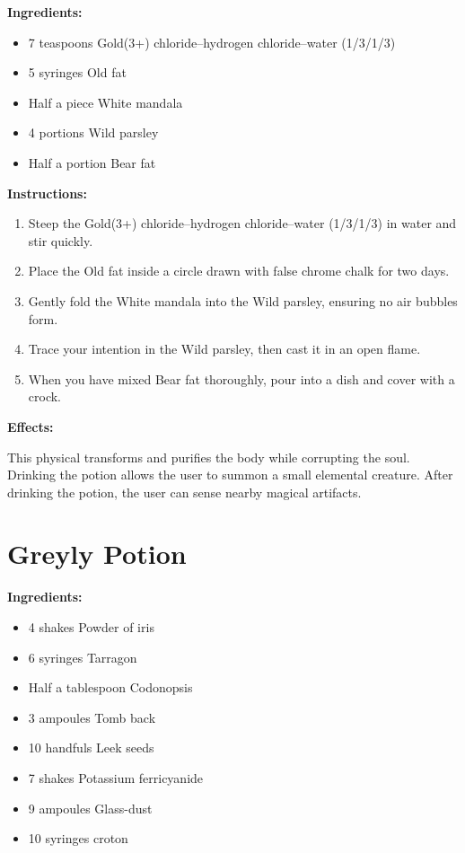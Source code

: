 \documentclass{article}
\begin{document}
\textbf{Ingredients:}

\begin{itemize}
  \item 7 teaspoons Gold(3+) chloride--hydrogen chloride--water (1/3/1/3)
  \item 5 syringes Old fat
  \item Half a piece White mandala
  \item 4 portions Wild parsley
  \item Half a portion Bear fat
\end{itemize}

\textbf{Instructions:}

\begin{enumerate}
  \item Steep the Gold(3+) chloride--hydrogen chloride--water (1/3/1/3) in water and stir quickly.
  \item Place the Old fat inside a circle drawn with false chrome chalk for two days.
  \item Gently fold the White mandala into the Wild parsley, ensuring no air bubbles form.
  \item Trace your intention in the Wild parsley, then cast it in an open flame.
  \item When you have mixed Bear fat thoroughly, pour into a dish and cover with a crock.
\end{enumerate}

\textbf{Effects:}

This physical transforms and purifies the body while corrupting the soul. Drinking the potion allows the user to summon a small elemental creature. After drinking the potion, the user can sense nearby magical artifacts.

\newpage
\section*{Greyly Potion}

\textbf{Ingredients:}

\begin{itemize}
  \item 4 shakes Powder of iris
  \item 6 syringes Tarragon
  \item Half a tablespoon Codonopsis
  \item 3 ampoules Tomb back
  \item 10 handfuls Leek seeds
  \item 7 shakes Potassium ferricyanide
  \item 9 ampoules Glass-dust
  \item 10 syringes croton
\end{itemize}
\end{document}

